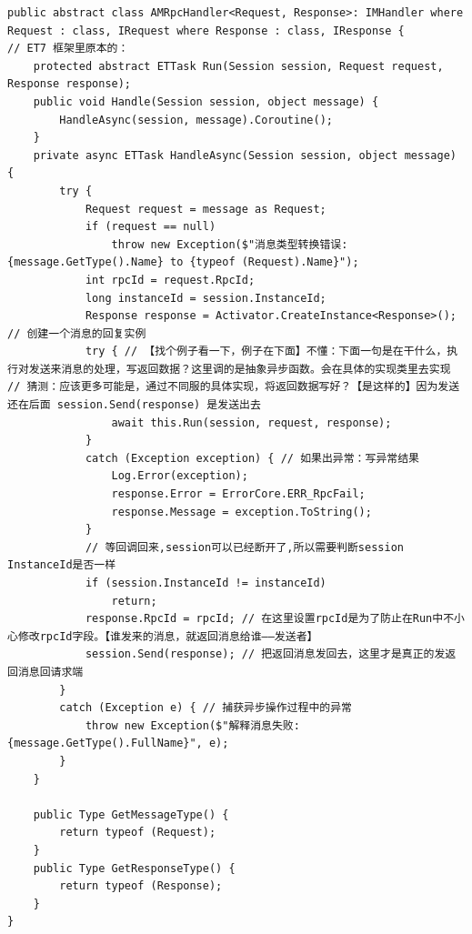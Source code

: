 \documentclass[9pt, b5paper]{article}
\begin{document}
\begin{verbatim}
public abstract class AMRpcHandler<Request, Response>: IMHandler where Request : class, IRequest where Response : class, IResponse {
// ET7 框架里原本的：
    protected abstract ETTask Run(Session session, Request request, Response response);
    public void Handle(Session session, object message) { 
        HandleAsync(session, message).Coroutine();
    }
    private async ETTask HandleAsync(Session session, object message) {
        try {
            Request request = message as Request;
            if (request == null) 
                throw new Exception($"消息类型转换错误: {message.GetType().Name} to {typeof (Request).Name}");
            int rpcId = request.RpcId;
            long instanceId = session.InstanceId;
            Response response = Activator.CreateInstance<Response>(); // 创建一个消息的回复实例
            try { // 【找个例子看一下，例子在下面】不懂：下面一句是在干什么，执行对发送来消息的处理，写返回数据？这里调的是抽象异步函数。会在具体的实现类里去实现
// 猜测：应该更多可能是，通过不同服的具体实现，将返回数据写好？【是这样的】因为发送还在后面 session.Send(response) 是发送出去
                await this.Run(session, request, response); 
            }
            catch (Exception exception) { // 如果出异常：写异常结果
                Log.Error(exception);
                response.Error = ErrorCore.ERR_RpcFail;
                response.Message = exception.ToString();
            }
            // 等回调回来,session可以已经断开了,所以需要判断session InstanceId是否一样
            if (session.InstanceId != instanceId) 
                return;
            response.RpcId = rpcId; // 在这里设置rpcId是为了防止在Run中不小心修改rpcId字段。【谁发来的消息，就返回消息给谁——发送者】
            session.Send(response); // 把返回消息发回去，这里才是真正的发返回消息回请求端
        }
        catch (Exception e) { // 捕获异步操作过程中的异常
            throw new Exception($"解释消息失败: {message.GetType().FullName}", e);
        }
    }

    public Type GetMessageType() {
        return typeof (Request);
    }
    public Type GetResponseType() {
        return typeof (Response);
    }
}
\end{verbatim}
\end{document}
